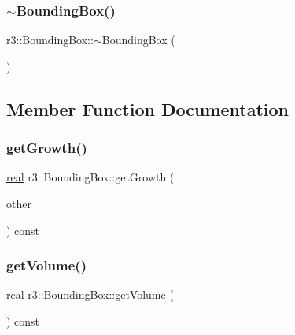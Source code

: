 \mbox{\label{classr3_1_1_bounding_box_a9257cfab936d3331cba765cb19527aa1}} 
\subsubsection{\texorpdfstring{$\sim$\+Bounding\+Box()}{~BoundingBox()}}
{\footnotesize\ttfamily r3\+::\+Bounding\+Box\+::$\sim$\+Bounding\+Box (\begin{DoxyParamCaption}{ }\end{DoxyParamCaption})}



\subsection{Member Function Documentation}
\mbox{\label{classr3_1_1_bounding_box_a21631e2fffeb995d3a9647489f936d13}} 
\subsubsection{\texorpdfstring{get\+Growth()}{getGrowth()}}
{\footnotesize\ttfamily \mbox{\hyperlink{namespacer3_ab2016b3e3f743fb735afce242f0dc1eb}{real}} r3\+::\+Bounding\+Box\+::get\+Growth (\begin{DoxyParamCaption}\item[{const \mbox{\hyperlink{classr3_1_1_bounding_box}{Bounding\+Box}} \&}]{other }\end{DoxyParamCaption}) const}

\mbox{\label{classr3_1_1_bounding_box_a3e6a9b79373dde150d18d5d5df59a2f3}} 
\subsubsection{\texorpdfstring{get\+Volume()}{getVolume()}}
{\footnotesize\ttfamily \mbox{\hyperlink{namespacer3_ab2016b3e3f743fb735afce242f0dc1eb}{real}} r3\+::\+Bounding\+Box\+::get\+Volume (\begin{DoxyParamCaption}{ }\end{DoxyParamCaption}) const}

